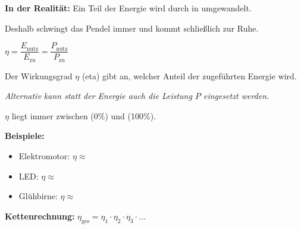 \documentclass[11pt, a4paper]{article}
\newcommand{\luecke}[1]{\underline{\hspace{#1}}}
\begin{document}
\begin{merkkasten}[title={\textbf{Kasten 3: Energieflussdiagramm}}]
\begin{center}
\end{center}

\vspace{4pt}
\textbf{In der Realität:} Ein Teil der Energie wird durch \luecke{2.5cm} in \luecke{2.5cm} umgewandelt.

Deshalb schwingt das Pendel immer \luecke{2.5cm} und kommt schließlich zur Ruhe.
\end{merkkasten}

\begin{merkkasten}[title={\textbf{Kasten 4: Wirkungsgrad}}]
\begin{formelkasten}
\centering
\Large $\eta = \dfrac{E_\text{nutz}}{E_\text{zu}} = \dfrac{P_\text{nutz}}{P_\text{zu}}$
\end{formelkasten}

\vspace{4pt}
Der Wirkungsgrad $\eta$ (eta) gibt an, welcher Anteil der zugeführten Energie \luecke{2cm} wird.

\textit{Alternativ kann statt der Energie auch die Leistung $P$ eingesetzt werden.}

$\eta$ liegt immer zwischen \luecke{1cm} (0\%) und \luecke{1cm} (100\%).

\vspace{6pt}
\textbf{Beispiele:}
\begin{itemize}[leftmargin=1.5em, itemsep=2pt]
\item Elektromotor: $\eta \approx$ \luecke{1.5cm}
\item LED: $\eta \approx$ \luecke{1.5cm}
\item Glühbirne: $\eta \approx$ \luecke{1.5cm}
\end{itemize}

\vspace{4pt}
\textbf{Kettenrechnung:} $\eta_\text{ges} = \eta_1 \cdot \eta_2 \cdot \eta_3 \cdot \ldots$
\end{merkkasten}
\end{document}
